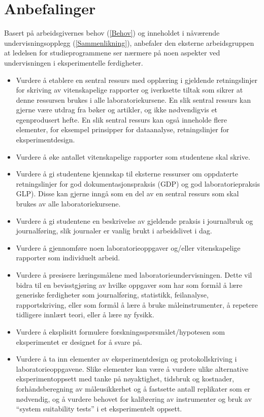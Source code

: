 \documentclass{article}
\begin{document}
\section{Anbefalinger}
Basert på arbeidsgivernes behov (\cref{Behov}) og inneholdet i nåværende undervisningsopplegg (\cref{Sammenlikning}), anbefaler den eksterne arbeidsgruppen at ledelsen for studieprogrammene ser nærmere på noen aspekter ved undervisningen i eksperimentelle ferdigheter.
\begin{itemize}
  \item Vurdere å etablere en sentral ressurs med opplæring i gjeldende retningslinjer for skriving av vitenskapelige rapporter og iverksette tiltak som sikrer at denne  ressursen brukes i alle laboratoriekursene. En slik sentral ressurs kan gjerne være utdrag fra bøker og artikler, og ikke nødvendigvis et egenprodusert hefte. En slik sentral ressurs kan også inneholde flere elementer, for eksempel prinsipper for dataanalyse, retningslinjer for eksperimentdesign. \item Vurdere å øke antallet vitenskapelige rapporter som studentene skal skrive. 
  \item Vurdere å gi studentene kjennskap til eksterne ressurser om oppdaterte retningslinjer for god dokumentasjonspraksis (GDP) og god laboratoriepraksis GLP). Disse kan gjerne inngå som en del av en sentral ressurs som skal brukes av alle laboratoriekursene.
  \item Vurdere å gi studentene en beskrivelse av gjeldende praksis i journalbruk og journalføring, slik journaler er vanlig brukt i arbeidslivet i dag.
  \item Vurdere å gjennomføre noen laboratorieoppgaver og/eller vitenskapelige rapporter som individuelt arbeid.
  \item Vurdere å presisere læringsmålene med laboratorieundervisningen. Dette vil bidra til en bevisstgjøring av hvilke oppgaver som har som formål å lære generiske ferdigheter som journalføring, statistikk, feilanalyse, rapportskriving, eller som formål å lære å bruke måleinstrumenter, å repetere tidligere innlært teori, eller å lære ny fysikk. 
  \item Vurdere å eksplisitt formulere forskningsspørsmålet/hypotesen som eksperimentet er designet for å svare på.
  \item Vurdere å ta inn elementer av eksperimentdesign og protokollskriving i laboratorieoppgavene. Slike elementer kan være å vurdere ulike alternative eksperimentoppsett med tanke på nøyaktighet, tidsbruk og kostnader, forhåndsberegning av måleusikkerhet og å fastsette antall replikater som er nødvendig, og å vurdere behovet for kalibrering av instrumenter og bruk av ``system suitability tests'' i et eksperimentelt oppsett.
\end{itemize}
\end{document}
